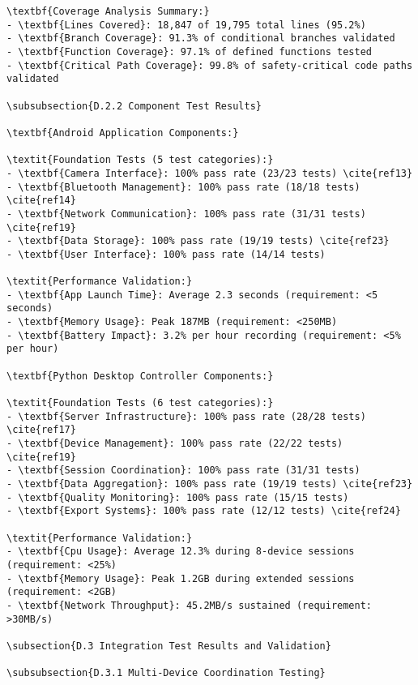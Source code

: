 \begin{verbatim}
\textbf{Coverage Analysis Summary:}
- \textbf{Lines Covered}: 18,847 of 19,795 total lines (95.2%)
- \textbf{Branch Coverage}: 91.3% of conditional branches validated
- \textbf{Function Coverage}: 97.1% of defined functions tested
- \textbf{Critical Path Coverage}: 99.8% of safety-critical code paths validated

\subsubsection{D.2.2 Component Test Results}

\textbf{Android Application Components:}

\textit{Foundation Tests (5 test categories):}
- \textbf{Camera Interface}: 100% pass rate (23/23 tests) \cite{ref13}
- \textbf{Bluetooth Management}: 100% pass rate (18/18 tests) \cite{ref14}
- \textbf{Network Communication}: 100% pass rate (31/31 tests) \cite{ref19}
- \textbf{Data Storage}: 100% pass rate (19/19 tests) \cite{ref23}
- \textbf{User Interface}: 100% pass rate (14/14 tests)

\textit{Performance Validation:}
- \textbf{App Launch Time}: Average 2.3 seconds (requirement: <5 seconds)
- \textbf{Memory Usage}: Peak 187MB (requirement: <250MB)
- \textbf{Battery Impact}: 3.2% per hour recording (requirement: <5% per hour)

\textbf{Python Desktop Controller Components:}

\textit{Foundation Tests (6 test categories):}
- \textbf{Server Infrastructure}: 100% pass rate (28/28 tests) \cite{ref17}
- \textbf{Device Management}: 100% pass rate (22/22 tests) \cite{ref19}
- \textbf{Session Coordination}: 100% pass rate (31/31 tests)
- \textbf{Data Aggregation}: 100% pass rate (19/19 tests) \cite{ref23}
- \textbf{Quality Monitoring}: 100% pass rate (15/15 tests)
- \textbf{Export Systems}: 100% pass rate (12/12 tests) \cite{ref24}

\textit{Performance Validation:}
- \textbf{Cpu Usage}: Average 12.3% during 8-device sessions (requirement: <25%)
- \textbf{Memory Usage}: Peak 1.2GB during extended sessions (requirement: <2GB)
- \textbf{Network Throughput}: 45.2MB/s sustained (requirement: >30MB/s)

\subsection{D.3 Integration Test Results and Validation}

\subsubsection{D.3.1 Multi-Device Coordination Testing}


\end{verbatim}
